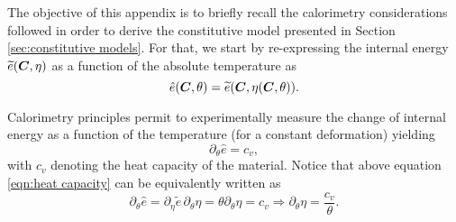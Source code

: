 The objective of this appendix is to briefly recall the calorimetry considerations followed in order to derive the constitutive model presented in Section \ref{sec:constitutive models}. For that, we start by re-expressing the internal energy $\widetilde{e}(\boldsymbol{C},\eta)$ as a function of the absolute temperature as
%
\begin{equation}
\hat{e}(\boldsymbol{C},\theta) = \widetilde{e}(\boldsymbol{C},\eta(\boldsymbol{C},\theta)).
\end{equation}
%

Calorimetry principles permit to experimentally measure the change of internal energy as a function of the temperature (for a constant deformation) yielding 
%
\begin{equation}\label{eqn:heat capacity}
\partial_{\theta}\hat{e} = c_v,
\end{equation}
%
with $c_v$ denoting the heat capacity of the material. Notice that above equation \eqref{eqn:heat capacity} can be equivalently written as
%
\begin{equation}\label{eqn:thermo model I}
\partial_{\theta}\hat{e} = \partial_{\eta}\widetilde{e}\,\partial_{\theta}\eta = \theta\partial_{\theta}\eta   =c_v\Rightarrow
%
\partial_{\theta}\eta = \frac{c_v}{\theta}.
\end{equation} 

